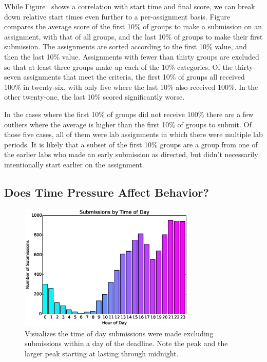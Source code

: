While Figure~ shows a correlation with start
time and final score, we can break down relative start times even further to a
per-assignment basis. Figure~ compares the average
score of the first 10\% of groups to make a submission on an assignment, with
that of all groups, and the last 10\% of groups to make their first
submission. The assignments are sorted according to the first 10\% value, and
then the last 10\% value. Assignments with fewer than thirty groups are
excluded so that at least three groups make up each of the 10\% categories. Of
the thirty-seven assignments that meet the criteria, the first 10\% of groups
all received 100\% in twenty-six, with only five where the last 10\% also
received 100\%. In the other twenty-one, the last 10\% scored significantly
worse.

In the cases where the first 10\% of groups did not receive 100\% there are a
few outliers where the average is higher than the first 10\% of groups to
submit. Of those five cases, all of them were lab assignments in which there
were multiple lab periods. It is likely that a subset of the first 10\% groups
are a group from one of the earlier labs who made an early submission as
directed, but didn't necessarily intentionally start earlier on the assignment.

\subsection{Does Time Pressure Affect Behavior?}

\begin{figure}[!t]
\centering
\includegraphics[width=3.3in]{graphs/Submissions_by_Time_of_Day.eps}
\caption{Visualizes the time of day submissions were made excluding submissions
  within a day of the deadline. Note the  peak and the larger peak
  starting at  lasting through midnight.}
\end{figure}

